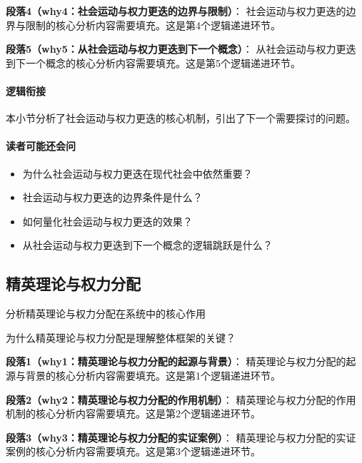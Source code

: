 \documentclass[../main.tex]{subfiles}
\begin{document}
\textbf{段落4（why4：社会运动与权力更迭的边界与限制）}：
社会运动与权力更迭的边界与限制的核心分析内容需要填充。这是第4个逻辑递进环节。


\textbf{段落5（why5：从社会运动与权力更迭到下一个概念）}：
从社会运动与权力更迭到下一个概念的核心分析内容需要填充。这是第5个逻辑递进环节。


\paragraph*{逻辑衔接}
本小节分析了社会运动与权力更迭的核心机制，引出了下一个需要探讨的问题。

\paragraph*{读者可能还会问}
\begin{itemize}
\item 为什么社会运动与权力更迭在现代社会中依然重要？
\item 社会运动与权力更迭的边界条件是什么？
\item 如何量化社会运动与权力更迭的效果？
\item 从社会运动与权力更迭到下一个概念的逻辑跳跃是什么？
\end{itemize}


\subsection{精英理论与权力分配}

\begin{motivation}
分析精英理论与权力分配在系统中的核心作用
\end{motivation}

\begin{logicmap}
[逻辑链占位]
\end{logicmap}

\begin{questionbox}
为什么精英理论与权力分配是理解整体框架的关键？
\end{questionbox}

\textbf{段落1（why1：精英理论与权力分配的起源与背景）}：
精英理论与权力分配的起源与背景的核心分析内容需要填充。这是第1个逻辑递进环节。


\textbf{段落2（why2：精英理论与权力分配的作用机制）}：
精英理论与权力分配的作用机制的核心分析内容需要填充。这是第2个逻辑递进环节。


\textbf{段落3（why3：精英理论与权力分配的实证案例）}：
精英理论与权力分配的实证案例的核心分析内容需要填充。这是第3个逻辑递进环节。
\end{document}
